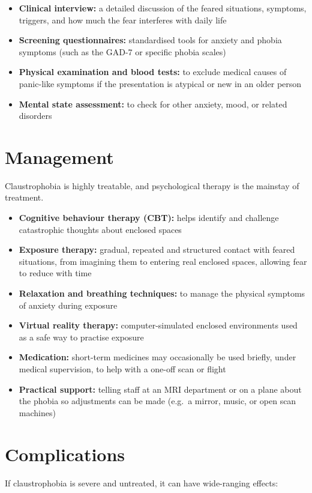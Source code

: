 \begin{itemize}
    \item \textbf{Clinical interview:} a detailed discussion of the feared situations, symptoms, triggers, and how much the fear interferes with daily life
    \item \textbf{Screening questionnaires:} standardised tools for anxiety and phobia symptoms (such as the GAD-7 or specific phobia scales)
    \item \textbf{Physical examination and blood tests:} to exclude medical causes of panic-like symptoms if the presentation is atypical or new in an older person
    \item \textbf{Mental state assessment:} to check for other anxiety, mood, or related disorders
\end{itemize}

\section*{Management}
Claustrophobia is highly treatable, and psychological therapy is the mainstay of treatment.

\begin{itemize}
    \item \textbf{Cognitive behaviour therapy (CBT):} helps identify and challenge catastrophic thoughts about enclosed spaces
    \item \textbf{Exposure therapy:} gradual, repeated and structured contact with feared situations, from imagining them to entering real enclosed spaces, allowing fear to reduce with time
    \item \textbf{Relaxation and breathing techniques:} to manage the physical symptoms of anxiety during exposure
    \item \textbf{Virtual reality therapy:} computer-simulated enclosed environments used as a safe way to practise exposure
    \item \textbf{Medication:} short-term medicines may occasionally be used briefly, under medical supervision, to help with a one-off scan or flight
    \item \textbf{Practical support:} telling staff at an MRI department or on a plane about the phobia so adjustments can be made (e.g.\ a mirror, music, or open scan machines)
\end{itemize}

\section*{Complications}
If claustrophobia is severe and untreated, it can have wide-ranging effects:

